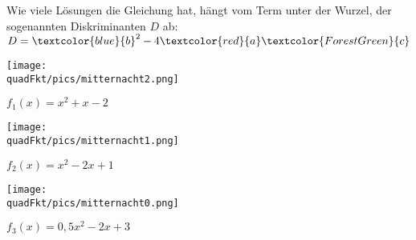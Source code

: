 Wie viele Lösungen die Gleichung hat, hängt vom Term unter der Wurzel, der sogenannten Diskriminanten \(D\) ab:
\(D=\textcolor{blue}{b}^2-4 \textcolor{red}{a}  \textcolor{ForestGreen}{c}\)

\bigskip

\begin{minipage}{\textwidth}
	\begin{minipage}{0.33\textwidth}

		\texttt{[image: \\quadFkt/pics/mitternacht2.png]}

		\(f_1(x)=x^2+x-2\)
	\end{minipage}%
	\begin{minipage}{0.33\textwidth}

		\texttt{[image: \\quadFkt/pics/mitternacht1.png]}

		\(f_2(x)=x^2-2x+1\)
	\end{minipage}%
	\begin{minipage}{0.33\textwidth}

		\texttt{[image: \\quadFkt/pics/mitternacht0.png]}

		\(f_3(x)=0,5x^2-2x+3\)
	\end{minipage}%
\end{minipage}

\bigskip

\begin{minipage}{\textwidth}
	\begin{minipage}{0.33\textwidth}
		\centering{\(\textcolor{loes}{x^2+x-2=0}\)}
	\end{minipage}%
	\begin{minipage}{0.33\textwidth}
		\centering{\(\textcolor{loes}{x^2+2x+1=0}\)}
	\end{minipage}%
	\begin{minipage}{0.33\textwidth}
		\centering{\(\textcolor{loes}{0,5x^2+2x+3=0}\)}
	\end{minipage}%
\end{minipage}

\bigskip

